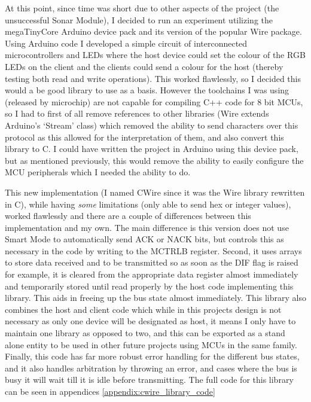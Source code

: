 \documentclass[11pt,a4paper,titlepage]{report}
\begin{document}
	 At this point, since time was short due to other aspects of the project (the unsuccessful Sonar Module), I decided to run an experiment utilizing the megaTinyCore\cite{MEGATINYCORE} Arduino device pack and its version of the popular Wire package\cite{MEGATINYCORE_WIRE}. Using Arduino code I developed a simple circuit of interconnected microcontrollers and LEDs where the host device could set the colour of the RGB LEDs on the client and the clients could send a colour for the host (thereby testing both read and write operations). This worked flawlessly, so I decided this would a be good library to use as a basis. However the toolchains I was using (released by microchip) are not capable for compiling C++ code for 8 bit MCUs, so I had to first of all remove references to other libraries (Wire extends Arduino's `Stream' class) which removed the ability to send characters over this protocol as this allowed for the interpretation of them, and also convert this library to C. I could have written the project in Arduino using this device pack, but as mentioned previously, this would remove the ability to easily configure the MCU peripherals which I needed the ability to do.
	 
	  This new implementation (I named CWire since it was the Wire library rewritten in C), while having \textit{some} limitations (only able to send hex or integer values), worked flawlessly and there are a couple of differences between this implementation and my own. The main difference is this version does not use Smart Mode to automatically send ACK or NACK bits, but controls this as necessary in the code by writing to the MCTRLB register. Second, it uses arrays to store data received and to be transmitted so as soon as the DIF flag is raised for example, it is cleared from the appropriate data register almost immediately and temporarily stored until read properly by the host code implementing this library. This aids in freeing up the bus state almost immediately. This library also combines the host and client code which while in this projects design is not necessary as only one device will be designated as host, it means I only have to maintain one library as opposed to two, and this can be exported as a stand alone entity to be used in other future projects using MCUs in the same family. Finally, this code has far more robust error handling for the different bus states, and it also handles arbitration by throwing an error, and cases where the bus is busy it will wait till it is idle before transmitting. The full code for this library can be seen in appendices \ref{appendix:cwire_library_code}
	
\end{document}
